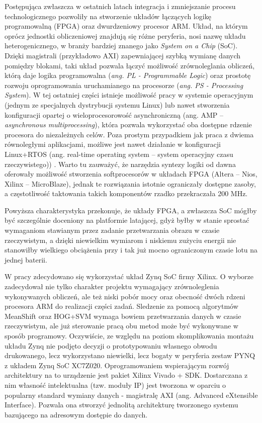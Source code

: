 Postępująca zwłaszcza w ostatnich latach integracja i zmniejszanie procesu technologicznego pozwoliły na stworzenie układów łączących logikę programowalną (FPGA) oraz dwurdzeniowy procesor ARM. 
Układ, na którym oprócz jednostki obliczeniowej znajdują się różne peryferia, nosi nazwę układu heterogenicznego, w branży bardziej znanego jako \textit{System on a Chip} (SoC).
Dzięki magistrali (przykładowo AXI) zapewniającej szybką wymianę danych pomiędzy blokami, taki układ pozwala łączyć możliwość zrównoleglania obliczeń, którą daje logika programowalna (\textit{ang. PL - Programmable Logic}) oraz prostotę rozwoju oprogramowania uruchamianego na procesorze (\textit{ang. PS - Processing System}). 
W tej ostatniej części istnieje możliwość pracy w systemie operacyjnym (jednym ze specjalnych dystrybucji systemu Linux) lub nawet stworzenia konfiguracji opartej o wieloprocesorowość asynchroniczną (ang. AMP -- \textit{asynchronous multiprocessing}), która pozwala wykorzystać oba dostępne rdzenie procesora do niezależnych celów. 
Poza prostym przypadkiem jak praca z dwiema równoległymi aplikacjami, możliwe jest nawet działanie w konfiguracji Linux+RTOS (ang. real-time operating system -- system operacyjny czasu rzeczywistego)) \cite{AMP}. %
Warto tu zauważyć, że narzędzia syntezy logiki od dawna oferowały możliwość stworzenia softprocesorów w układach FPGA (Altera -- Nios, Xilinx -- MicroBlaze), jednak te rozwiązania istotnie ograniczały dostępne zasoby, a częstotliwość taktowania takich komponentów rzadko przekraczała 200 MHz. 

Powyższa charakterystyka przekonuje, że układy FPGA, a zwłaszcza SoC mógłby być szczególnie doceniony na platformie latającej, gdyż byłby w stanie sprostać wymaganiom stawianym przez zadanie przetwarzania obrazu w czasie rzeczywistym, a dzięki niewielkim wymiarom i niskiemu zużyciu energii nie stanowiłby wielkiego obciążenia przy i tak już mocno ograniczonym czasie lotu na jednej baterii. 

W pracy zdecydowano się wykorzystać układ Zynq SoC firmy Xilinx. 
O wyborze zadecydował nie tylko charakter projektu wymagający zrównoleglenia wykonywanych obliczeń, ale też niski pobór mocy oraz obecność dwóch rdzeni procesora ARM do realizacji części zadań. Sledzenie za pomocą algorytmów MeanShift oraz HOG+SVM wymaga bowiem przetwarzania danych w czasie rzeczywistym, ale już sterowanie pracą obu metod może być wykonywane w sposób programowy.  %
Oczywiście, ze względu na poziom skomplikowania montażu układu Zynq nie podjęto decyzji o prototypowaniu własnego obwodu drukowanego, lecz wykorzystano niewielki, lecz bogaty w peryferia zestaw PYNQ z układem Zynq SoC XC7Z020. 
Oprogramowaniem wspierającym rozwój architektury na to urządzenie jest pakiet Xilinx Vivado + SDK. Dostarczana z nim własność intelektualna (tzw. moduły IP) jest tworzona w oparciu o popularny standard wymiany danych - magistralę AXI (ang. Advanced eXtensible Interface). Pozwala ona stworzyć jednolitą architekturę tworzonego systemu bazującego na adresowym dostępie do danych.

